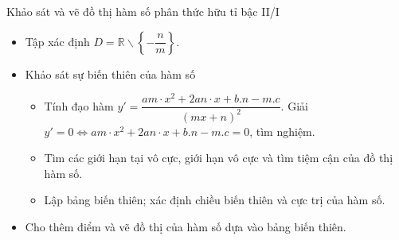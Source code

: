 \begin{dang}{Khảo sát và vẽ đồ thị hàm số phân thức hữu tỉ bậc II/I}
	\begin{itemize}
		\item[\iconCH]  Tập xác định $D=\mathbb{R}\backslash \left\{-\dfrac{n}{m}\right\}$.
		\item [\iconCH]  Khảo sát sự biến thiên của hàm số
		\begin{itemize}
			\item Tính đạo hàm $y'=\dfrac{am\cdot x^2+2an\cdot x + b.n - m.c}{(mx+n)^2}$. Giải $y'=0 \Leftrightarrow am\cdot x^2+2an\cdot x + b.n - m.c=0$, tìm nghiệm.
			\item Tìm các giới hạn tại vô cực, giới hạn vô cực và tìm tiệm cận của đồ thị hàm số.
			\item Lập bảng biến thiên; xác định chiều biến thiên và cực trị của hàm số.
		\end{itemize}
		\item [\iconCH]  Cho thêm điểm và vẽ đồ thị của hàm số dựa vào bảng biến thiên.
	\end{itemize}
\end{dang}
